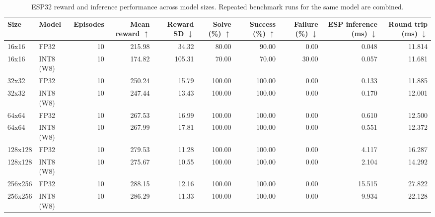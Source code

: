 \begin{table}[htbp]
\centering
\small
\caption{ESP32 reward and inference performance across model sizes. Repeated benchmark runs for the same model are combined.}
\label{tab:esp-benchmark-all}
\begin{adjustbox}{max width=\linewidth}
\begin{tabular}{llrrrrrrrr}
\toprule
Size & Model & Episodes & Mean reward $\uparrow$ & Reward SD $\downarrow$ & Solve (\%) $\uparrow$ & Success (\%) $\uparrow$ & Failure (\%) $\downarrow$ & ESP inference (ms) $\downarrow$ & Round trip (ms) $\downarrow$ \\
\midrule
16x16 & FP32 & 10 & 215.98 & 34.32 & 80.00 & 90.00 & 0.00 & 0.048 & 11.814 \\
16x16 & INT8 (W8) & 10 & 174.82 & 105.31 & 70.00 & 70.00 & 30.00 & 0.057 & 11.681 \\
\midrule
32x32 & FP32 & 10 & 250.24 & 15.79 & 100.00 & 100.00 & 0.00 & 0.133 & 11.885 \\
32x32 & INT8 (W8) & 10 & 247.44 & 13.43 & 100.00 & 100.00 & 0.00 & 0.170 & 12.001 \\
\midrule
64x64 & FP32 & 10 & 267.53 & 16.99 & 100.00 & 100.00 & 0.00 & 0.610 & 12.500 \\
64x64 & INT8 (W8) & 10 & 267.99 & 17.81 & 100.00 & 100.00 & 0.00 & 0.551 & 12.372 \\
\midrule
128x128 & FP32 & 10 & 279.53 & 11.28 & 100.00 & 100.00 & 0.00 & 4.117 & 16.287 \\
128x128 & INT8 (W8) & 10 & 275.67 & 10.55 & 100.00 & 100.00 & 0.00 & 2.104 & 14.292 \\
\midrule
256x256 & FP32 & 10 & 288.15 & 12.16 & 100.00 & 100.00 & 0.00 & 15.515 & 27.822 \\
256x256 & INT8 (W8) & 10 & 286.29 & 11.33 & 100.00 & 100.00 & 0.00 & 9.934 & 22.128 \\
\bottomrule
\end{tabular}
\end{adjustbox}
\end{table}
